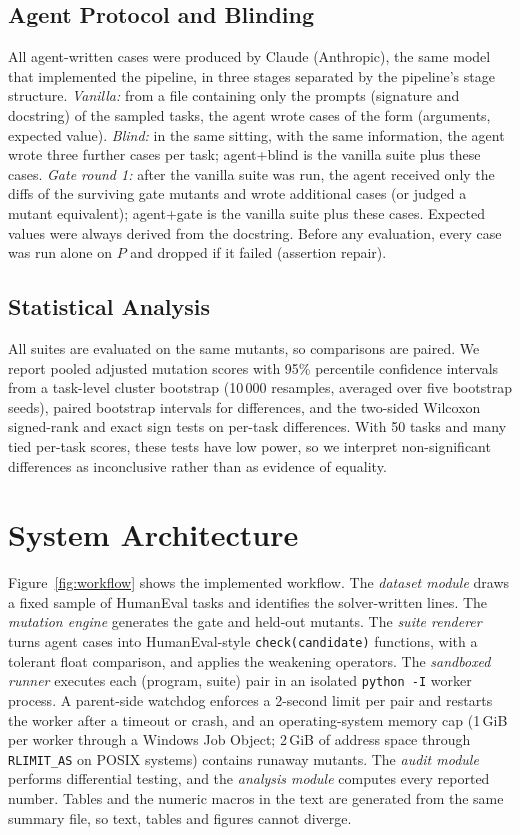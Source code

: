 \documentclass[runningheads]{llncs}
\begin{document}
\subsection{Agent Protocol and Blinding}
All agent-written cases were produced by Claude (Anthropic), the same model that implemented the pipeline, in three stages separated by the pipeline's stage structure. \emph{Vanilla:} from a file containing only the prompts (signature and docstring) of the sampled tasks, the agent wrote cases of the form (arguments, expected value). \emph{Blind:} in the same sitting, with the same information, the agent wrote three further cases per task; agent+blind is the vanilla suite plus these cases. \emph{Gate round 1:} after the vanilla suite was run, the agent received only the diffs of the surviving gate mutants and wrote additional cases (or judged a mutant equivalent); agent+gate is the vanilla suite plus these cases. Expected values were always derived from the docstring. Before any evaluation, every case was run alone on $P$ and dropped if it failed (assertion repair).

\subsection{Statistical Analysis}
All suites are evaluated on the same mutants, so comparisons are paired. We report pooled adjusted mutation scores with 95\% percentile confidence intervals from a task-level cluster bootstrap (10\,000 resamples, averaged over five bootstrap seeds), paired bootstrap intervals for differences, and the two-sided Wilcoxon signed-rank and exact sign tests on per-task differences. With 50 tasks and many tied per-task scores, these tests have low power, so we interpret non-significant differences as inconclusive rather than as evidence of equality.

\section{System Architecture}\label{sec:arch}

Figure~\ref{fig:workflow} shows the implemented workflow. The \emph{dataset module} draws a fixed sample of HumanEval tasks and identifies the solver-written lines. The \emph{mutation engine} generates the gate and held-out mutants. The \emph{suite renderer} turns agent cases into HumanEval-style \texttt{check(candidate)} functions, with a tolerant float comparison, and applies the weakening operators. The \emph{sandboxed runner} executes each (program, suite) pair in an isolated \texttt{python -I} worker process. A parent-side watchdog enforces a 2-second limit per pair and restarts the worker after a timeout or crash, and an operating-system memory cap (1\,GiB per worker through a Windows Job Object; 2\,GiB of address space through \texttt{RLIMIT\_AS} on POSIX systems) contains runaway mutants. The \emph{audit module} performs differential testing, and the \emph{analysis module} computes every reported number. Tables and the numeric macros in the text are generated from the same summary file, so text, tables and figures cannot diverge.
\end{document}
